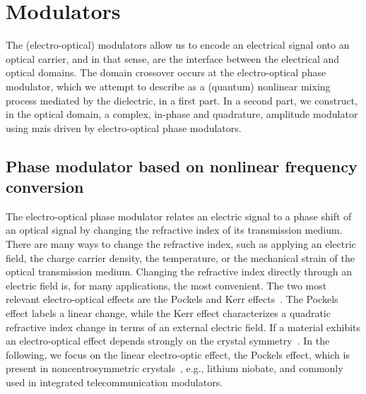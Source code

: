 \section{Modulators}

The (electro-optical) modulators allow us to encode an electrical signal onto an optical carrier, and in that sense, are the interface between the electrical and optical domains.
The domain crossover occurs at the electro-optical phase modulator, which we attempt to describe as a (quantum) nonlinear mixing process mediated by the dielectric, in a first part.
In a second part, we construct, in the optical domain, a complex, in-phase and quadrature, amplitude modulator using \gls{mzi}s driven by electro-optical phase modulators.

\subsection{Phase modulator based on nonlinear frequency conversion}

The electro-optical phase modulator relates an electric signal to a phase shift of an optical signal by changing the refractive index of its transmission medium.
There are many ways to change the refractive index, such as applying an electric field, the charge carrier density, the temperature, or the mechanical strain of the optical transmission medium.
Changing the refractive index directly through an electric field is, for many applications, the most convenient.
The two most relevant electro-optical effects are the Pockels and Kerr effects~\cite[Ch.~18]{Saleh2007}.
The Pockels effect labels a linear change, while the Kerr effect characterizes a quadratic refractive index change in terms of an external electric field.
If a material exhibits an electro-optical effect depends strongly on the crystal symmetry~\cite[p.~237]{Yariv1984}.
In the following, we focus on the linear electro-optic effect, the Pockels effect, which is present in noncentrosymmetric crystals~\cite[p.~2]{Boyd2020}, e.g., lithium niobate, and commonly used in integrated telecommunication modulators.

